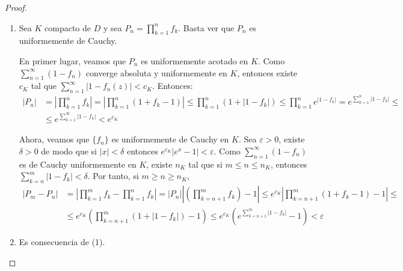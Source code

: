\begin{proof}
    \hfill
    \begin{enumerate}
        \item Sea $K$ compacto de $D$ y sea $P_n = \prod_{k=1}^n f_k$.
              Basta ver que $P_n$ es uniformemente de Cauchy.

              En primer lugar, veamos que $P_n$ es uniformemente acotado en $K$.
              Como $\sum_{n=1}^\infty (1-f_n)$ converge absoluta y uniformemente en $K$, entonces existe $c_K$ tal que $\sum_{n=1}^\infty |1-f_n(z)| < c_K$.
              Entonces:
              \begin{align*}
                  |P_n| & = \left|\prod_{k=1}^n f_k\right| = \left|\prod_{k=1}^n (1+f_k-1)\right| \leq \prod_{k=1}^n (1+|1-f_k|) \leq \prod_{k=1}^n e^{|1-f_k|} = e^{\sum_{k=1}^n |1-f_k|} \leq \\
                        & \leq e^{\sum_{k=1}^\infty |1-f_k|} < e^{c_K}
              \end{align*}

              Ahora, veamos que $\{f_n\}$ es uniformemente de Cauchy en $K$.
              Sea $\varepsilon > 0$, existe $\delta > 0$ de modo que si $|x| < \delta$ entonces $e^{c_K}|e^x-1| < \varepsilon$.
              Como $\sum_{n=1}^\infty (1-f_n)$ es de Cauchy uniformemente en $K$, existe $n_K$ tal que si $m \leq n \leq n_K$, entonces $\sum_{k=n}^m |1-f_k| < \delta$.
              Por tanto, si $m \geq n \geq n_K$,
              \begin{align*}
                  |P_m - P_n| & = \left|\prod_{k=1}^m f_k - \prod_{k=1}^n f_k\right| = |P_n|\left|\left(\prod_{k=n+1}^m f_k\right) - 1\right| \leq e^{c_K}\left|\prod_{k=n+1}^m (1+f_k-1) - 1\right| \leq \\
                              & \leq e^{c_K}\left(\prod_{k=n+1}^m (1+|1-f_k|) - 1\right) \leq e^{c_K}\left(e^{\sum_{k=n+1}^m |1-f_k|}-1\right) < \varepsilon
              \end{align*}

        \item Es consecuencia de (1).


\end{enumerate}
\end{proof}
